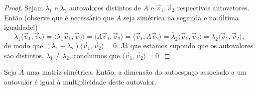 \documentclass[../livro.tex]{subfiles}
\begin{document}
\begin{proof}
	Sejam $\lambda_1$ e  $\lambda_2$ autovalores distintos de $A$ e $\vec{v}_1, \vec{v}_2$ respectivos autovetores. Então (observe que é necessário que $A$ seja simétrica na segunda e na última igualdade!)
	\begin{equation}
	\lambda_1 \langle \vec{v}_1, \vec{v}_2\rangle = \langle \lambda_1 \vec{v}_1, \vec{v}_2\rangle = \langle A \vec{v}_1, \vec{v}_2\rangle = \langle \vec{v}_1, A \vec{v}_2\rangle = \overline{\lambda}_2 \langle \vec{v}_1, \vec{v}_2\rangle = \lambda_2 \langle \vec{v}_1, \vec{v}_2\rangle,
	\end{equation} de modo que $(\lambda_1 - \lambda_2)\langle \vec{v}_1, \vec{v}_2\rangle = 0$. Já que estamos supondo que os autovalores são distintos, $\lambda_1 \neq \lambda_2$, concluimos que $\langle \vec{v}_1, \vec{v}_2\rangle = 0$.
\end{proof}


\begin{proposition}\label{dimens}
	Seja $A$ uma matriz simétrica. Então, a dimensão do autoespaço associado a um autovalor é igual à multiplicidade deste autovalor.
\end{proposition}
\end{document}
